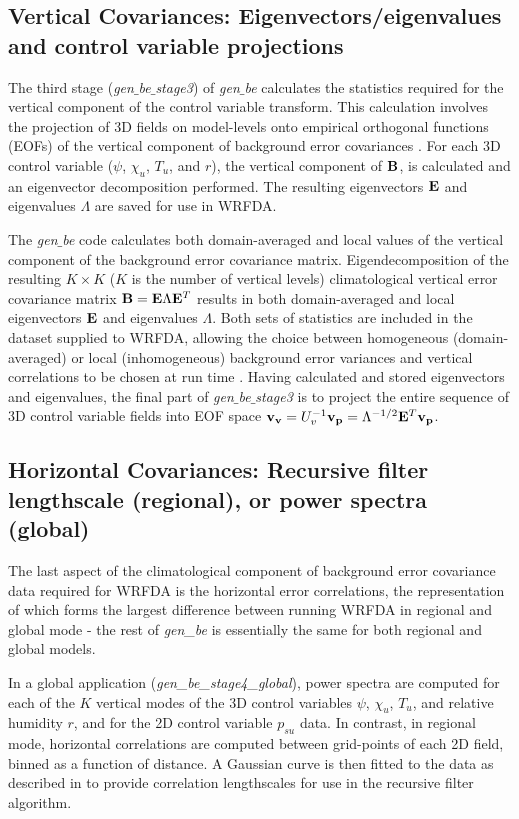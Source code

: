 \subsection{Vertical Covariances: Eigenvectors/eigenvalues and 
control variable projections} 

The third stage ({\it gen$\_$be$\_$stage3}) of {\it gen$\_$be}
calculates the statistics required for the vertical component of the
control variable transform. This calculation involves the projection
of 3D fields on model-levels onto empirical orthogonal functions
(EOFs) of the vertical component of background error covariances
\citet{barker04}. For each 3D control variable ($\psi$, $\chi_u$,
$T_u$, and $r$), the vertical component of ${\bf B}$, is calculated
and an eigenvector decomposition performed. The resulting eigenvectors
${\bf E}$ and eigenvalues $\Lambda$ are saved for use in WRFDA.

The {\it gen$\_$be} code calculates both domain-averaged and local
values of the vertical component of the background error covariance
matrix. Eigendecomposition of the resulting $K\times K$ ($K$ is the number of 
vertical levels) climatological vertical error covariance matrix ${\bf
B}={\bf E}{\Lambda}{\bf E}^{T}$ results in both domain-averaged and
local eigenvectors $\bf E$ and eigenvalues $\Lambda$. Both sets of
statistics are included in the dataset supplied to WRFDA, allowing
the choice between homogeneous (domain-averaged) or local
(inhomogeneous) background error variances and vertical correlations
to be chosen at run time \citet{barker04}.
Having calculated and stored eigenvectors and eigenvalues, the final
part of {\it gen$\_$be$\_$stage3} is to project the entire sequence of
3D control variable fields into EOF space ${\bf v_v}=U_{v}^{-1}{\bf
v_p}=\Lambda^{-1/2}{\bf E}^{T} {\bf v_p}$.

\subsection{Horizontal Covariances: Recursive filter lengthscale (regional), or power 
spectra (global)}

The last aspect of the climatological component of background error
covariance data required for WRFDA is the horizontal error
correlations, the representation of which forms the largest difference
between running WRFDA in regional and global mode - the rest of 
{\it gen\_be} is essentially the same for both regional and global models.

In a global application ({\it gen\_be\_stage4\_global}), power spectra
are computed for each of the $K$ vertical modes of the 3D control
variables $\psi$, $\chi_u$, $T_u$, and relative humidity $r$, and for the 2D control
variable $p_{su}$ data. In contrast, in regional mode, horizontal
correlations are computed between grid-points of each 2D field, binned
as a function of distance. A Gaussian curve is then fitted to the data
as described in \citet{barker04} to provide correlation lengthscales
for use in the recursive filter algorithm.
